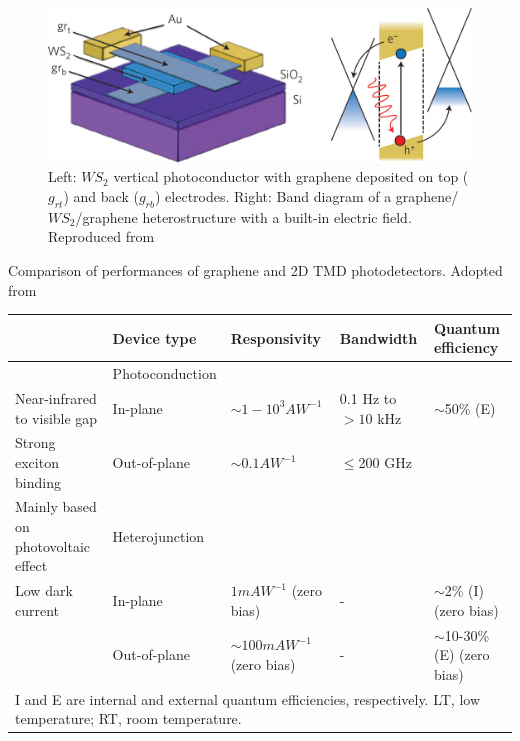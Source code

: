 \begin{figure}[!h]
	\begin{center}
		\includegraphics[scale=0.25]{PhotoconductorDiagram.png}
		\caption{Left: $WS_2$ vertical photoconductor with graphene deposited on top ($g_{rt}$) and back ($g_{rb}$) electrodes. Right: Band diagram of a graphene/$WS_2$/graphene heterostructure with a built-in electric field. Reproduced from \cite{Mak2016}}
		\label{fig:PhotoconductorDiagram}
	\end{center}
\end{figure}

\newpage
\begin{table}[!ht]
	\label{tab:GrapheneTMDCPhotodectorsComparison}
	\caption{Comparison of performances of graphene and 2D TMD photodetectors. Adopted from \cite{Mak2016}}
\end{table}

\begin{tiny}
	\begin{center}
		\begin{tabular}{l|llll}

									& Device type		& Responsivity				& Bandwidth			& Quantum efficiency	\\\hline
									& Photoconduction	& 							&					&						\\	
Near-infrared to visible gap		& In-plane			& $\sim 1-10^3 AW^{-1}$		& 0.1 Hz to $>10$ kHz & $\sim$50\% (E) 			\\
Strong exciton binding				& Out-of-plane		& $\sim 0.1 AW^{-1}$		& $\leq$200 GHz 	& 						\\
Mainly based on photovoltaic effect & Heterojunction 	& 							& 					&						\\
Low dark current					& In-plane			& $1 mAW^{-1}$ (zero bias)	& - 				& $\sim$2\% (I) (zero bias) 	\\
									& Out-of-plane		& $\sim 100 mAW^{-1}$ (zero bias)& -			& $\sim$10-30\% (E) (zero bias) \\\hline
\multicolumn{5}{l}{I and E are internal and external quantum efficiencies, respectively. LT, low temperature; RT, room temperature.}

		\end{tabular}
	\end{center}
\end{tiny}

